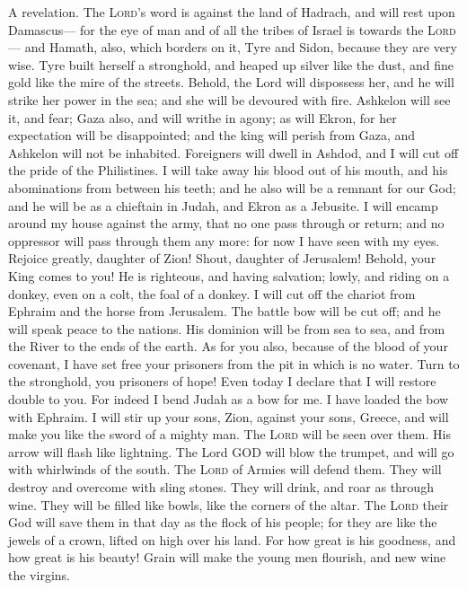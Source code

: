  A revelation. The \textsc{Lord}'s word is against the
land of Hadrach, and will rest upon Damascus--- for the eye of man and
of all the tribes of Israel is towards the \textsc{Lord}---
 and Hamath, also, which borders on it, Tyre and Sidon,
because they are very wise.  Tyre built herself a
stronghold, and heaped up silver like the dust, and fine gold like the
mire of the streets.  Behold, the Lord will dispossess
her, and he will strike her power in the sea; and she will be devoured
with fire.  Ashkelon will see it, and fear; Gaza also, and
will writhe in agony; as will Ekron, for her expectation will be
disappointed; and the king will perish from Gaza, and Ashkelon will not
be inhabited.  Foreigners will dwell in Ashdod, and I will
cut off the pride of the Philistines.  I will take away
his blood out of his mouth, and his abominations from between his teeth;
and he also will be a remnant for our God; and he will be as a chieftain
in Judah, and Ekron as a Jebusite.  I will encamp around
my house against the army, that no one pass through or return; and no
oppressor will pass through them any more: for now I have seen with my
eyes.  Rejoice greatly, daughter of Zion! Shout, daughter
of Jerusalem! Behold, your King comes to you! He is righteous, and
having salvation; lowly, and riding on a donkey, even on a colt, the
foal of a donkey.  I will cut off the chariot from
Ephraim and the horse from Jerusalem. The battle bow will be cut off;
and he will speak peace to the nations. His dominion will be from sea to
sea, and from the River to the ends of the earth.  As for
you also, because of the blood of your covenant, I have set free your
prisoners from the pit in which is no water.  Turn to the
stronghold, you prisoners of hope! Even today I declare that I will
restore double to you.  For indeed I bend Judah as a bow
for me. I have loaded the bow with Ephraim. I will stir up your sons,
Zion, against your sons, Greece, and will make you like the sword of a
mighty man.  The \textsc{Lord} will be seen over them.
His arrow will flash like lightning. The Lord GOD will blow the trumpet,
and will go with whirlwinds of the south.  The
\textsc{Lord} of Armies will defend them. They will destroy and overcome
with sling stones. They will drink, and roar as through wine. They will
be filled like bowls, like the corners of the altar.  The
\textsc{Lord} their God will save them in that day as the flock of his
people; for they are like the jewels of a crown, lifted on high over his
land.  For how great is his goodness, and how great is
his beauty! Grain will make the young men flourish, and new wine the
virgins.

